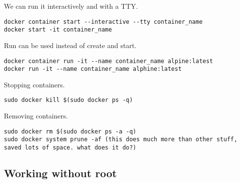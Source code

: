 We can run it interactively and with a TTY.

\begin{verbatim}
docker container start --interactive --tty container_name
docker start -it container_name
\end{verbatim}

Run can be used instead of create and start.
\begin{verbatim}
docker container run -it --name container_name alpine:latest
docker run -it --name container_name alphine:latest
\end{verbatim}

Stopping containers.
\begin{verbatim}
sudo docker kill $(sudo docker ps -q)
\end{verbatim}

Removing containers.
\begin{verbatim}
sudo docker rm $(sudo docker ps -a -q)
sudo docker system prune -af (this does much more than other stuff, saved lots of space. what does it do?)
\end{verbatim}


\subsection{Working without root}

